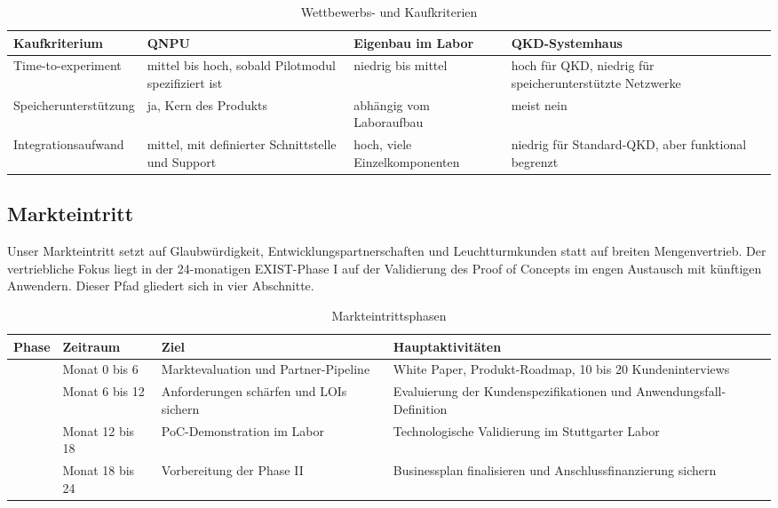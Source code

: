 \documentclass[11pt,oneside]{scrartcl}
\begin{document}
\begin{table}[ht]
\centering
\small
\begin{tabularx}{\textwidth}{>{\raggedright\arraybackslash}p{} X X X X}
\toprule
Kaufkriterium & QNPU & Eigenbau im Labor & QKD-Systemhaus \\
\midrule
Time-to-experiment & mittel bis hoch, sobald Pilotmodul spezifiziert ist & niedrig bis mittel & hoch f\"ur QKD, niedrig f\"ur speicherunterst\"utzte Netzwerke \\
Speicherunterst\"utzung & ja, Kern des Produkts & abh\"angig vom Laboraufbau & meist nein \\
Integrationsaufwand & mittel, mit definierter Schnittstelle und Support & hoch, viele Einzelkomponenten & niedrig f\"ur Standard-QKD, aber funktional begrenzt \\
\bottomrule
\end{tabularx}
\caption{Wettbewerbs- und Kaufkriterien}
\end{table}

\subsection{Markteintritt}
Unser Markteintritt setzt auf Glaubw\"urdigkeit, Entwicklungspartnerschaften und Leuchtturmkunden statt auf breiten Mengenvertrieb. Der vertriebliche Fokus liegt in der 24-monatigen EXIST-Phase I auf der Validierung des Proof of Concepts im engen Austausch mit k\"unftigen Anwendern. Dieser Pfad gliedert sich in vier Abschnitte.

\begin{table}[ht]
\centering
\small
\begin{tabularx}{\textwidth}{>{\raggedright\arraybackslash}p{} X X X}
\toprule
Phase & Zeitraum & Ziel & Hauptaktivit\"aten \\
\midrule
1 & Monat 0 bis 6 & Marktevaluation und Partner-Pipeline & White Paper, Produkt-Roadmap, 10 bis 20 Kundeninterviews \\
2 & Monat 6 bis 12 & Anforderungen sch\"arfen und LOIs sichern & Evaluierung der Kundenspezifikationen und Anwendungsfall-Definition \\
3 & Monat 12 bis 18 & PoC-Demonstration im Labor & Technologische Validierung im Stuttgarter Labor \\
4 & Monat 18 bis 24 & Vorbereitung der Phase II & Businessplan finalisieren und Anschlussfinanzierung sichern \\
\bottomrule
\end{tabularx}
\caption{Markteintrittsphasen}
\end{table}
\end{document}
